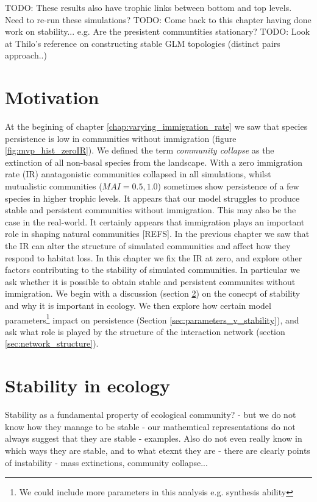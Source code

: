 TODO: These results also have trophic links between bottom and top levels. Need to re-run these simulations?
TODO: Come back to this chapter having done work on stability... e.g. Are the presistent communtities stationary?
TODO: Look at Thilo's reference on constructing stable GLM topologies (distinct pairs approach..)

\section{Motivation}
\label{sec:motivate_stability}

At the begining of chapter \ref{chap:varying_immigration_rate} we saw that species persistence is low in communities without immigration (figure \ref{fig:mvp_hist_zeroIR}). We defined the term \emph{community collapse} as the extinction of all non-basal species from the landscape. With a zero immigration rate (IR) anatagonistic communities collapsed in all simulations, whilst mutualistic communities ($MAI=0.5,1.0$) sometimes show persistence of a few species in higher trophic levels. It appears that our model struggles to produce stable and persistent communities without immigration. This may also be the case in the real-world. It certainly appears that immigration plays an important role in shaping natural communities [REFS]. In the previous chapter we saw that the IR can alter the structure of simulated communities and affect how they respond to habitat loss. In this chapter we fix the IR at zero, and explore other factors contributing to the stability of simulated communities. In particular we ask whether it is possible to obtain stable and persistent communites without immigration. We begin with a discussion (section \ref{sec:lit_review_stability}) on the conecpt of stability and why it is important in ecology. We then explore how certain model parameters\footnote{We could include more parameters in this analysis e.g. synthesis ability} impact on persistence (Section \ref{sec:parameters_v_stability}), and ask what role is played by the structure of the interaction network (section \ref{sec:network_structure}).  

\section{Stability in ecology}
\label{sec:lit_review_stability}

Stability as a fundamental property of ecological community? - but we do not know how they manage to be stable - our mathemtical representations do not always suggest that they are stable - examples. Also do not even really know in which ways they are stable, and to what etexnt they are - there are clearly points of instability - mass extinctions, community collapse... 

